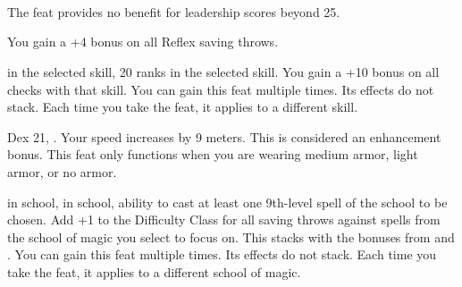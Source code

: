 {{\\

\\

\\

}
}
{The  feat provides no benefit for leadership scores beyond 25.}{}

{}{You gain a +4 bonus on all Reflex saving throws.}

{}
{ in the selected skill, 20 ranks in the selected skill.}
{You gain a +10 bonus on all checks with that skill.}
{}{You can gain this feat multiple times. Its effects do not stack. Each time you take the feat, it applies to a different skill.}

{}
{Dex 21, .}
{Your speed increases by 9 meters. This is considered an enhancement bonus.}
{}{This feat only functions when you are wearing medium armor, light armor, or no armor.}

{}
{ in school,  in school, ability to cast at least one 9th-level spell of the school to be chosen.}
{Add +1 to the Difficulty Class for all saving throws against spells from the school of magic you select to focus on. This stacks with the bonuses from  and .}
{}{You can gain this feat multiple times. Its effects do not stack. Each time you take the feat, it applies to a different school of magic.}






